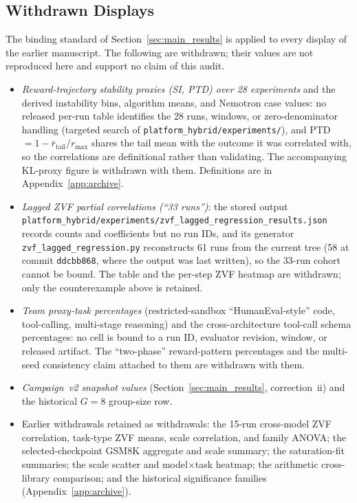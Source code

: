 \documentclass{article}
\begin{document}
\subsection{Withdrawn Displays}
\label{sec:withdrawn}
The binding standard of Section~\ref{sec:main_results} is applied to every
display of the earlier manuscript. The following are withdrawn; their values are
not reproduced here and support no claim of this audit.
\begin{itemize}[leftmargin=*,itemsep=1pt]
\item \emph{Reward-trajectory stability proxies (SI, PTD) over 28 experiments}
and the derived instability bins, algorithm means, and Nemotron case values: no
released per-run table identifies the 28 runs, windows, or zero-denominator
handling (targeted search of \texttt{platform\_hybrid/experiments/}), and PTD
$=1-\bar r_{\mathrm{tail}}/r_{\max}$ shares the tail mean with the outcome it was
correlated with, so the correlations are definitional rather than validating. The
accompanying KL-proxy figure is withdrawn with them. Definitions are in
Appendix~\ref{app:archive}.
\item \emph{Lagged ZVF partial correlations (``33 runs'')}: the stored output
\texttt{platform\_hybrid/experiments/zvf\_lagged\_regression\_results.json}
records counts and coefficients but no run IDs, and its generator
\texttt{zvf\_lagged\_regression.py} reconstructs 61 runs from the current tree
(58 at commit \texttt{ddcbb868}, where the output was last written), so the
33-run cohort cannot be bound. The table and the per-step ZVF heatmap are
withdrawn; only the counterexample above is retained.
\item \emph{Team proxy-task percentages} (restricted-sandbox ``HumanEval-style''
code, tool-calling, multi-stage reasoning) and the cross-architecture
tool-call schema percentages: no cell is bound to a run ID, evaluator revision,
window, or released artifact. The ``two-phase'' reward-pattern percentages and
the multi-seed consistency claim attached to them are withdrawn with them.
\item \emph{Campaign~v2 snapshot values} (Section~\ref{sec:main_results},
correction~ii) and the historical $G=8$ group-size row.
\item Earlier withdrawals retained as withdrawals: the 15-run cross-model ZVF
correlation, task-type ZVF means, scale correlation, and family ANOVA; the
selected-checkpoint GSM8K aggregate and scale summary; the saturation-fit
summaries; the scale scatter and model$\times$task heatmap; the arithmetic
cross-library comparison; and the historical significance families
(Appendix~\ref{app:archive}).
\end{itemize}
\end{document}
